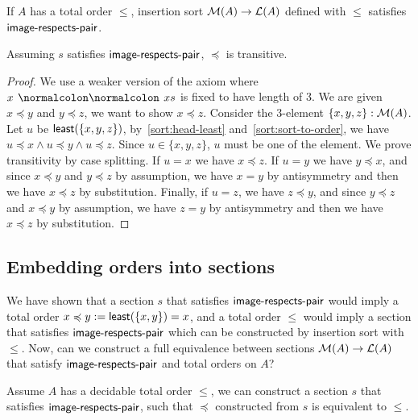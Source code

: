 \begin{proposition}
    If $A$ has a total order $\leq$, insertion sort $\mathcal{M}(A) \to \mathcal{L}(A)$ defined with $\leq$
    satisfies $\operatorname{\mathsf{image-respects-pair}}$.
\end{proposition}

\begin{proposition}\label{sort:trans}
    Assuming $s$ satisfies $\operatorname{\mathsf{image-respects-pair}}$, $\preccurlyeq$ is transitive.
\end{proposition}
\begin{proof}
    We use a weaker version of the axiom where $x \cons xs$ is fixed to have length of 3.
    We are given $x \preccurlyeq y$ and $y \preccurlyeq z$, we want to show $x \preccurlyeq z$.
    Consider the 3-element $\{x,y,z\} : \mathcal{M}(A)$. Let $u$ be $\operatorname{\mathsf{least}}(\{x,y,z\})$,
    by~\cref{sort:head-least} and~\cref{sort:sort-to-order},
    we have $u \preccurlyeq x \land u \preccurlyeq y \land u \preccurlyeq z$.
    Since $u \in \{x,y,z\}$, $u$ must be one of the element. We prove transitivity by case splitting.
    If $u = x$ we have $x \preccurlyeq z$. If $u = y$ we have $y \preccurlyeq x$, and since
    $x \preccurlyeq y$ and $y \preccurlyeq z$ by assumption,
    we have $x = y$ by antisymmetry and then we have $x \preccurlyeq z$ by substitution.
    Finally, if $u = z$, we have $z \preccurlyeq y$, and since
    $y \preccurlyeq z$ and $x \preccurlyeq y$ by assumption,
    we have $z = y$ by antisymmetry and then we have $x \preccurlyeq z$ by substitution.
\end{proof}

\subsection{Embedding orders into sections}

We have shown that a section $s$ that satisfies $\operatorname{\mathsf{image-respects-pair}}$ would imply a total order
$x \preccurlyeq y := \operatorname{\mathsf{least}}(\{x, y\}) = x$,
and a total order $\leq$ would imply a section that satisfies $\operatorname{\mathsf{image-respects-pair}}$ which can
be constructed by insertion sort with $\leq$. Now, can we construct a full equivalence
between sections $\mathcal{M}(A) \to \mathcal{L}(A)$ that satisfy $\operatorname{\mathsf{image-respects-pair}}$ and total orders on $A$?

\begin{proposition}\label{sort:o2s2o}
    Assume $A$ has a decidable total order $\leq$, we can construct a section $s$ that
    satisfies $\operatorname{\mathsf{image-respects-pair}}$, such that $\preccurlyeq$ constructed from $s$ is equivalent
    to $\leq$.
\end{proposition}

